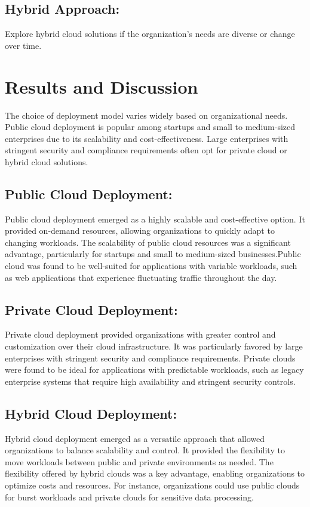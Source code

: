 \documentclass[12pt]{report}
\begin{document}
\subsection*{Hybrid Approach:}  Explore hybrid cloud solutions if the organization's needs are diverse or change over time.



\newpage
\section*{Results and Discussion}
The choice of deployment model varies widely based on organizational needs. Public cloud deployment is popular among startups and small to medium-sized enterprises due to its scalability and cost-effectiveness. Large enterprises with stringent security and compliance requirements often opt for private cloud or hybrid cloud solutions.\cite{review}
\subsection*{Public Cloud Deployment:}
Public cloud deployment emerged as a highly scalable and cost-effective option. It provided on-demand resources, allowing organizations to quickly adapt to changing workloads.
The scalability of public cloud resources was a significant advantage, particularly for startups and small to medium-sized businesses.Public cloud was found to be well-suited for applications with variable workloads, such as web applications that experience fluctuating traffic throughout the day.
\subsection*{Private Cloud Deployment:}
Private cloud deployment provided organizations with greater control and customization over their cloud infrastructure. It was particularly favored by large enterprises with stringent security and compliance requirements.
Private clouds were found to be ideal for applications with predictable workloads, such as legacy enterprise systems that require high availability and stringent security controls.
\subsection*{Hybrid Cloud Deployment:}
Hybrid cloud deployment emerged as a versatile approach that allowed organizations to balance scalability and control. It provided the flexibility to move workloads between public and private environments as needed.
The flexibility offered by hybrid clouds was a key advantage, enabling organizations to optimize costs and resources. For instance, organizations could use public clouds for burst workloads and private clouds for sensitive data processing.\cite{challenges}
\end{document}
